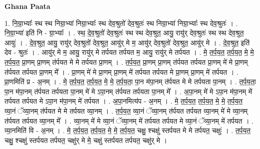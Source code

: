 \documentclass[17pt]{extarticle}
\begin{document}
\textbf{Ghana Paata } \newline

1. नि॒ग्रा॒भ्याः᳚ स्थ स्थ निग्रा॒भ्या॑ निग्रा॒भ्याः᳚ स्थ देव॒श्रुतो॑ देव॒श्रुतः॑ स्थ निग्रा॒भ्या॑ निग्रा॒भ्याः᳚ स्थ देव॒श्रुतः॑ । . नि॒ग्रा॒भ्या॑ इति॑ नि - ग्रा॒भ्याः᳚ । . स्थ॒ दे॒व॒श्रुतो॑ देव॒श्रुतः॑ स्थ स्थ देव॒श्रुत॒ आयु॒ रायु॑र् देव॒श्रुतः॑ स्थ स्थ देव॒श्रुत॒ आयुः॑ । . दे॒व॒श्रुत॒ आयु॒ रायु॑र् देव॒श्रुतो॑ देव॒श्रुत॒ आयु॑र् मे म॒ आयु॑र् देव॒श्रुतो॑ देव॒श्रुत॒ आयु॑र् मे । . दे॒व॒श्रुत॒ इति॑ देव - श्रुतः॑ । . आयु॑र् मे म॒ आयु॒ रायु॑र् मे तर्पयत तर्पयत म॒ आयु॒ रायु॑र् मे तर्पयत । . मे॒ त॒र्प॒य॒त॒ त॒र्प॒य॒त॒ मे॒ मे॒ त॒र्प॒य॒त॒ प्रा॒णम् प्रा॒णम् त॑र्पयत मे मे तर्पयत प्रा॒णम् । . त॒र्प॒य॒त॒ प्रा॒णम् प्रा॒णम् त॑र्पयत तर्पयत प्रा॒णम् मे॑ मे प्रा॒णम् त॑र्पयत तर्पयत प्रा॒णम् मे᳚ । . प्रा॒णम् मे॑ मे प्रा॒णम् प्रा॒णम् मे॑ तर्पयत तर्पयत मे प्रा॒णम् प्रा॒णम् मे॑ तर्पयत । . प्रा॒णमिति॑ प्र - अ॒नम् । . मे॒ त॒र्प॒य॒त॒ त॒र्प॒य॒त॒ मे॒ मे॒ त॒र्प॒य॒ता॒ पा॒न म॑पा॒नम् त॑र्पयत मे मे तर्पयता पा॒नम् । . त॒र्प॒य॒ता॒ पा॒न म॑पा॒नम् त॑र्पयत तर्पयता पा॒नम् मे॑ मे ऽपा॒नम् त॑र्पयत तर्पयता पा॒नम् मे᳚ । . अ॒पा॒नम् मे॑ मे ऽपा॒न म॑पा॒नम् मे॑ तर्पयत तर्पयत मे ऽपा॒न म॑पा॒नम् मे॑ तर्पयत । . अ॒पा॒नमित्य॑प - अ॒नम् । . मे॒ त॒र्प॒य॒त॒ त॒र्प॒य॒त॒ मे॒ मे॒ त॒र्प॒य॒त॒ व्या॒नं ॅव्या॒नम् त॑र्पयत मे मे तर्पयत व्या॒नम् । . त॒र्प॒य॒त॒ व्या॒नं ॅव्या॒नम् त॑र्पयत तर्पयत व्या॒नम् मे॑ मे व्या॒नम् त॑र्पयत तर्पयत व्या॒नम् मे᳚ । . व्या॒नम् मे॑ मे व्या॒नं ॅव्या॒नम् मे॑ तर्पयत तर्पयत मे व्या॒नं ॅव्या॒नम् मे॑ तर्पयत । . व्या॒नमिति॑ वि - अ॒नम् । . मे॒ त॒र्प॒य॒त॒ त॒र्प॒य॒त॒ मे॒ मे॒ त॒र्प॒य॒त॒ चक्षु॒ श्चक्षु॑ स्तर्पयत मे मे तर्पयत॒ चक्षुः॑ । . त॒र्प॒य॒त॒ चक्षु॒ श्चक्षु॑ स्तर्पयत तर्पयत॒ चक्षु॑र् मे मे॒ चक्षु॑ स्तर्पयत तर्पयत॒ चक्षु॑र् मे । \newline
\end{document}
